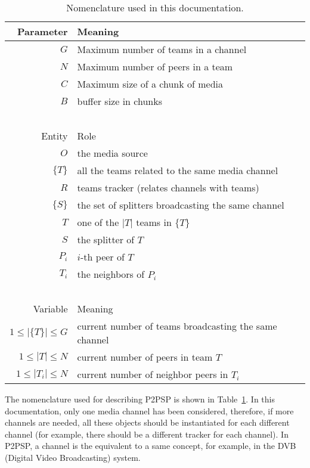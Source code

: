 \begin{table}
  \begin{tabular}{rl}
    Parameter & Meaning \\
    \hline
    $G$       & Maximum number of teams in a channel \\
    $N$       & Maximum number of peers in a team \\
    $C$       & Maximum size of a chunk of media \\
    $B$       & buffer size in chunks \\
    ~\\
    Entity  & Role \\
    \hline
    $O$     & the media source \\
    $\{T\}$ & all the teams related to the same media channel \\
    $R$     & teams tracker (relates channels with teams)\\
    $\{S\}$ & the set of splitters broadcasting the same channel \\
    $T$     & one of the $|T|$ teams in $\{T\}$ \\
    $S$     & the splitter of $T$ \\
    $P_i$   & $i$-th peer of $T$ \\
    $T_i$   & the neighbors of $P_i$ \\
    ~\\
    Variable            & Meaning \\
    \hline
    $1\leq |\{T\}|\leq G$ & current number of teams broadcasting the same channel \\
    $1\leq |T|\leq N$     & current number of peers in team $T$ \\
    $1\leq |T_i|\leq N$   & current number of neighbor peers in $T_i$ \\
  \end{tabular}
  \caption{Nomenclature used in this
    documentation.\label{tab:nomenclature}}
\end{table}

The nomenclature used for describing P2PSP is shown in
Table~\ref{tab:nomenclature}. In this documentation, only one media
channel has been considered, therefore, if more channels are needed,
all these objects should be instantiated for each different channel
(for example, there should be a different tracker for each
channel). In P2PSP, a channel is the equivalent to a same concept, for
example, in the DVB (Digital Video Broadcasting) system.
